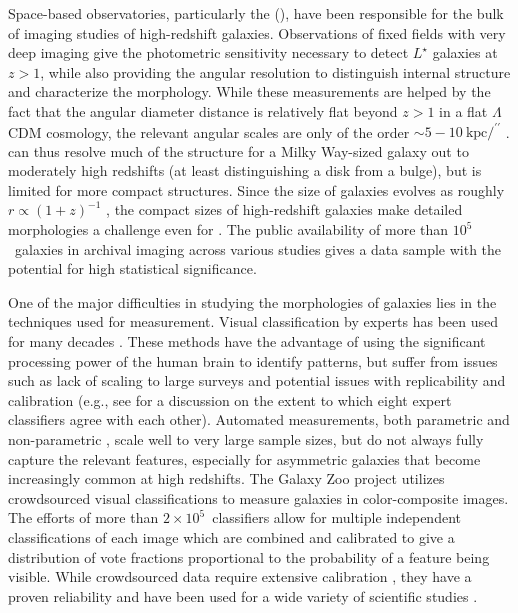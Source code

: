 \documentclass[twocolumn]{aastex6}
\begin{document}
Space-based observatories, particularly the \hubble{} (\hst), have been
responsible for the bulk of imaging studies of high-redshift galaxies.
Observations of fixed fields with very deep imaging
\citep[eg,][]{wil96,gia04,bec06,dav07,sco07,gro11} give the photometric
sensitivity necessary to detect $L^\star$ galaxies at $z>1$, while also
providing the angular resolution to distinguish internal structure and
characterize the morphology. While these measurements are helped by the fact
that the angular diameter distance is relatively flat beyond $z>1$ in a flat
$\Lambda$CDM cosmology, the relevant angular scales are only of the order
$\sim5-10~\mathrm{kpc}/^{\prime\prime}$ \citep{wri06}. \hst{} can thus resolve
much of the structure for a Milky Way-sized galaxy out to moderately high
redshifts (at least distinguishing a disk from a bulge), but is limited for
more compact structures. Since the size of galaxies evolves as roughly
$r\propto(1+z)^{-1}$ \citep{mao98,law12a}, the compact sizes of high-redshift
galaxies make detailed morphologies a challenge even for \hst{} \citep{che12}.
The public availability of more than $10^5$~galaxies in archival imaging across
various studies gives a data sample with the potential for high statistical
significance.

One of the major difficulties in studying the morphologies of galaxies lies in
the techniques used for measurement. Visual classification by experts has been
used for many decades \citep[eg,][]{hub26,dev59,san61,van76,nai10,bai11,kar15}.
These methods have the advantage of using the significant processing power of
the human brain to identify patterns, but suffer from issues such as lack of
scaling to large surveys and potential issues with replicability and
calibration (e.g., see \citealt{lah95} for a discussion on the extent to which
eight expert classifiers agree with each other). Automated measurements, both
parametric \citep{pen02a,sim11,lac12} and non-parametric
\citep{abr03,con03,lot04,sca07,bam08,fre13}, scale well to very large sample
sizes, but do not always fully capture the relevant features, especially for
asymmetric galaxies that become increasingly common at high redshifts. The
Galaxy Zoo project \citep{lin08} utilizes crowdsourced visual classifications
to measure galaxies in color-composite images. The efforts of more than
$2\times10^5$~classifiers allow for multiple independent classifications of
each image which are combined and calibrated to give a distribution of vote
fractions proportional to the probability of a feature being visible. While
crowdsourced data require extensive calibration \citep{bam09,wil13}, they have
a proven reliability and have been used for a wide variety of scientific
studies \citep[eg,][]{lan08,bam09,dar10,mas11c,ski12,sim13,sch14,wil15}. 
\end{document}
